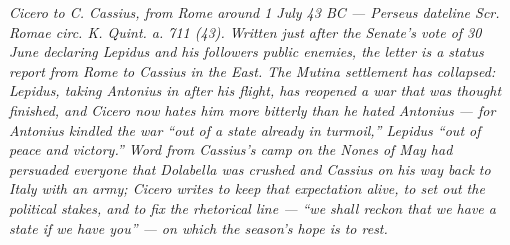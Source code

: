 
\textit{Cicero to C. Cassius, from Rome around 1 July 43 BC ---
Perseus dateline \textit{Scr. Romae circ. K. Quint. a. 711 (43)}.
Written just after the Senate's vote of 30 June declaring Lepidus and his
followers public enemies, the letter is a status report from Rome to
Cassius in the East. The Mutina settlement has collapsed: Lepidus, taking
Antonius in after his flight, has reopened a war that was thought finished,
and Cicero now hates him more bitterly than he hated Antonius --- for
Antonius kindled the war ``out of a state already in turmoil,'' Lepidus
``out of peace and victory.'' Word from Cassius's camp on the Nones of
May had persuaded everyone that Dolabella was crushed and Cassius on his
way back to Italy with an army; Cicero writes to keep that expectation
alive, to set out the political stakes, and to fix the rhetorical line ---
``we shall reckon that we have a state if we have you'' --- on which the
season's hope is to rest.}
